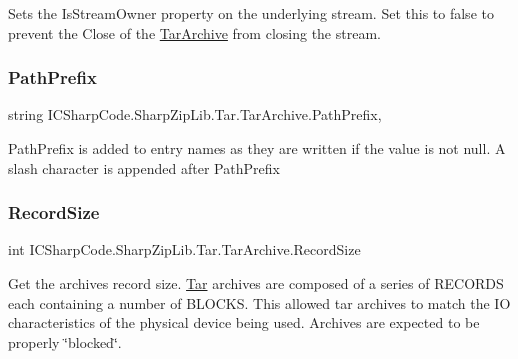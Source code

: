 Sets the Is\+Stream\+Owner property on the underlying stream. Set this to false to prevent the Close of the \hyperlink{class_i_c_sharp_code_1_1_sharp_zip_lib_1_1_tar_1_1_tar_archive}{Tar\+Archive} from closing the stream. 

\mbox{\label{class_i_c_sharp_code_1_1_sharp_zip_lib_1_1_tar_1_1_tar_archive_a3015fccbee20f9e44ef632f37b5a3c52}} 
\subsubsection{\texorpdfstring{Path\+Prefix}{PathPrefix}}
{\footnotesize\ttfamily string I\+C\+Sharp\+Code.\+Sharp\+Zip\+Lib.\+Tar.\+Tar\+Archive.\+Path\+Prefix\hspace{0.3cm}{\ttfamily [get]}, {\ttfamily [set]}}



Path\+Prefix is added to entry names as they are written if the value is not null. A slash character is appended after Path\+Prefix 

\mbox{\label{class_i_c_sharp_code_1_1_sharp_zip_lib_1_1_tar_1_1_tar_archive_a18fbe5ee8f336048f583c2b192a69571}} 
\subsubsection{\texorpdfstring{Record\+Size}{RecordSize}}
{\footnotesize\ttfamily int I\+C\+Sharp\+Code.\+Sharp\+Zip\+Lib.\+Tar.\+Tar\+Archive.\+Record\+Size\hspace{0.3cm}{\ttfamily [get]}}



Get the archive\textquotesingle{}s record size. \hyperlink{namespace_i_c_sharp_code_1_1_sharp_zip_lib_1_1_tar}{Tar} archives are composed of a series of R\+E\+C\+O\+R\+DS each containing a number of B\+L\+O\+C\+KS. This allowed tar archives to match the IO characteristics of the physical device being used. Archives are expected to be properly \char`\"{}blocked\char`\"{}. 

